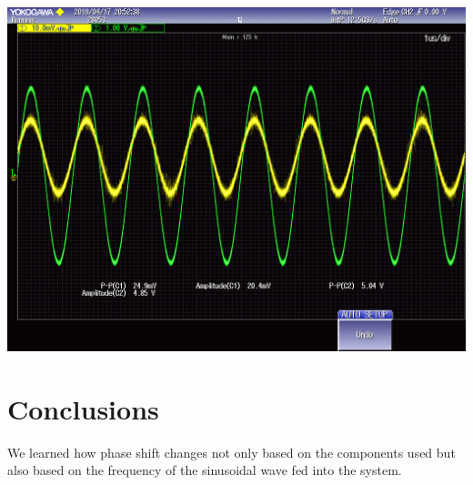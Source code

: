 \documentclass[journal]{IEEEtran}
\begin{document}
\begingroup
    \centering
    \medskip
    \includegraphics[width=\columnwidth]{images/lab8_012.png}
    \label{fig:phaseshift40}
    \medskip
\endgroup

\section{Conclusions}
\noindent We learned how phase shift changes not only based on the components used but also based on the frequency of the sinusoidal wave fed into the system.



\printbibliography
\end{document}
